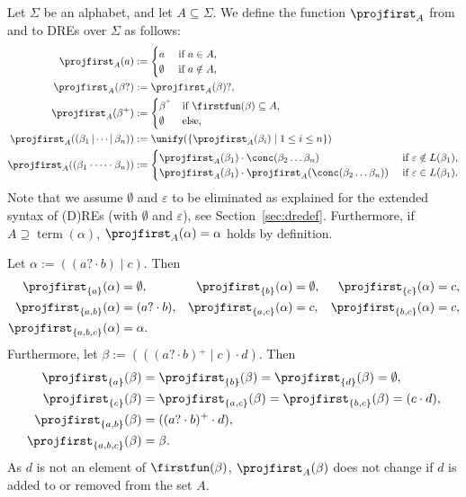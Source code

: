 \documentclass[a4paper,11pt, svgnames,titlepage]{article}
\newcommand{\rxp}{{^\mathtt{+}}}
\newcommand{\rxo}{\mathtt{?}}
\newcommand{\rxc}{\cdot}
\DeclareMathOperator{\ror}{\mathtt{|}}
\newcommand{\emptyword}{\varepsilon}
\newcommand{\df}{:=}
\DeclareMathOperator{\term}{term}
\begin{document}
Let $\Sigma$ be an alphabet, and let $A\subseteq \Sigma$. We define the function $\projfirst_A$ from and to DREs over $\Sigma$ as follows:
\begin{align*}
	\projfirst_A(a)&\df 
		\begin{cases}
			a & \text{ if $a\in A$,}\\
			\emptyset & \text{ if $a\notin A$,}
		\end{cases}\\
	\projfirst_A(\beta\rxo)&\df \projfirst_A(\beta)\rxo,\\
	\projfirst_A(\beta\rxp)&\df 
		\begin{cases}
			\beta^\rxp & \text{if $\firstfun(\beta)\subseteq A$,}\\
			\emptyset  & \text{else,}
		\end{cases}\\
	\projfirst_{A}((\beta_1\ror\cdots\ror\beta_n))&\df \unify(\{\projfirst_A(\beta_i)\mid 1\leq i \leq n\})\\
	\projfirst_{A}((\beta_1\rxc\cdots\rxc\beta_n))&\df
		\begin{cases}
			\projfirst_{A}(\beta_1)\rxc\conc(\beta_2\ldots\beta_n) & \text{ if $\emptyword\notin L(\beta_1)$,}\\
			\projfirst_{A}(\beta_1)\rxc\projfirst_{A}(\conc(\beta_2\ldots\beta_n)) & \text{ if $\emptyword\in L(\beta_1)$}.
		\end{cases}
\end{align*}
Note that we assume $\emptyset$ and $\emptyword$ to be eliminated as explained for the  extended syntax of (D)REs (with $\emptyset$ and $\emptyword$), see Section~\ref{sec:dredef}. Furthermore, if $A\supseteq\term(\alpha)$, $\projfirst_{A}(\alpha)=\alpha$ holds by definition.

Let $\alpha\df ((a\rxo \rxc b) \ror c )$. Then
\begin{align*}
	\projfirst_{\{a\}}(\alpha)&=\emptyset, &
	\projfirst_{\{b\}}(\alpha)&=\emptyset, &
	\projfirst_{\{c\}}(\alpha)&=c,\\
	\projfirst_{\{a,b\}}(\alpha)&=(a\rxo \rxc b), &
	\projfirst_{\{a,c\}}(\alpha)&=c, &
	\projfirst_{\{b,c\}}(\alpha)&=c,\\
	\projfirst_{\{a,b,c\}}(\alpha)&=\alpha. & & & &
\end{align*}
Furthermore, let $\beta\df (((a\rxo \rxc b)\rxp \ror c) \rxc d)$. Then
\begin{align*}
	\projfirst_{\{a\}}(\beta)&=\projfirst_{\{b\}}(\beta)=\projfirst_{\{d\}}(\beta)=\emptyset,\\
	\projfirst_{\{c\}}(\beta)&=\projfirst_{\{a,c\}}(\beta)=\projfirst_{\{b,c\}}(\beta)=(c \rxc d),\\
	\projfirst_{\{a,b\}}(\beta)&=((a\rxo \rxc b)\rxp \rxc d),\\
	\projfirst_{\{a,b,c\}}(\beta)&=\beta.
\end{align*}
As $d$ is not an element of $\firstfun(\beta)$, $\projfirst_{A}(\beta)$ does not change if $d$ is added to or removed from the set $A$.
\end{document}
